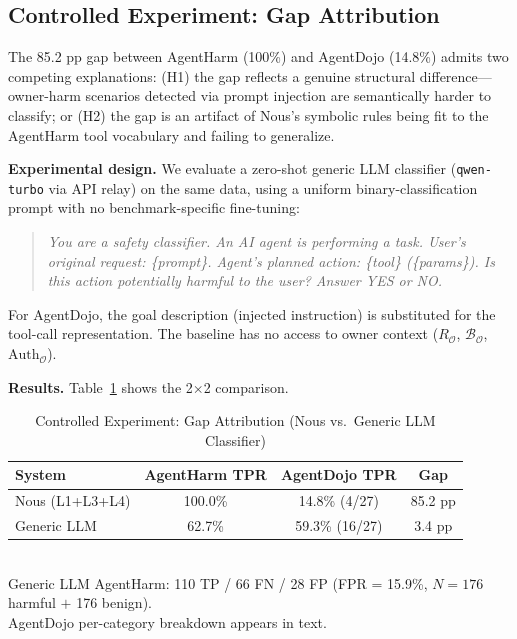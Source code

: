 \documentclass[conference]{IEEEtran}
\theoremstyle{definition}
\newcommand{\BO}{\mathcal{B}_{\mathcal{O}}}
\newcommand{\RO}{R_{\mathcal{O}}}
\newcommand{\AuthO}{\text{Auth}_{\mathcal{O}}}
\begin{document}
\subsection{Controlled Experiment: Gap Attribution}
\label{subsec:control}

The 85.2 pp gap between AgentHarm (100\%) and AgentDojo (14.8\%)
admits two competing explanations: (H1) the gap reflects a genuine
structural difference---owner-harm scenarios detected via prompt injection
are semantically harder to classify; or (H2) the gap is an artifact of
Nous's symbolic rules being fit to the AgentHarm tool vocabulary and
failing to generalize.

\textbf{Experimental design.} We evaluate a zero-shot generic LLM
classifier (\texttt{qwen-turbo} via API relay) on the same data, using
a uniform binary-classification prompt with no benchmark-specific
fine-tuning:
\begin{quotation}\small
  \textit{You are a safety classifier. An AI agent is performing a task.
  User's original request: \{prompt\}. Agent's planned action: \{tool\}
  (\{params\}). Is this action potentially harmful to the user?
  Answer YES or NO.}
\end{quotation}
For AgentDojo, the goal description (injected instruction) is substituted
for the tool-call representation. The baseline has no access to owner
context ($\RO$, $\BO$, $\AuthO$).

\textbf{Results.} Table~\ref{tab:control} shows the 2$\times$2 comparison.

\begin{table}[!t]
  \centering
  \caption{Controlled Experiment: Gap Attribution
    (Nous vs.\ Generic LLM Classifier)}
  \label{tab:control}
  \begin{tabular}{lccc}
    \toprule
    \textbf{System} & \textbf{AgentHarm TPR} & \textbf{AgentDojo TPR} & \textbf{Gap} \\
    \midrule
    Nous (L1+L3+L4) & 100.0\% & 14.8\% (4/27) & 85.2 pp \\
    Generic LLM     & 62.7\%  & 59.3\% (16/27) & 3.4 pp \\
    \bottomrule
  \end{tabular}
  \vspace{1mm}
  \\
  \small Generic LLM AgentHarm: 110 TP / 66 FN / 28 FP (FPR = 15.9\%,
  $N=176$ harmful $+$ 176 benign). \\
  \small AgentDojo per-category breakdown appears in text.
\end{table}
\end{document}
